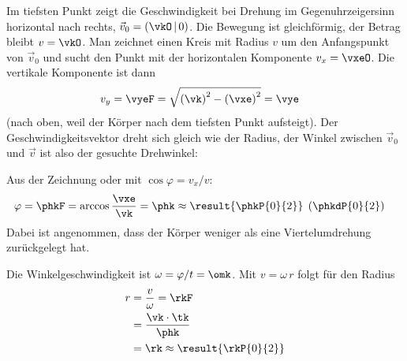 \begin{abcliste}
\abc Im tiefsten Punkt zeigt die Geschwindigkeit bei Drehung im Gegenuhrzeigersinn horizontal nach rechts, $\vec v_0 = \left(\vkO\,\middle|\,0\right)$. Die Bewegung ist gleichförmig, der Betrag bleibt $v = \vkO$. Man zeichnet einen Kreis mit Radius $v$ um den Anfangspunkt von $\vec v_0$ und sucht den Punkt mit der horizontalen Komponente $v_x = \vxeO$. Die vertikale Komponente ist dann
\begin{align}
 v_y &= \vyeF = \sqrt{\left(\vk\right)^2-\left(\vxe\right)^2} = \vye
\end{align}
(nach oben, weil der Körper nach dem tiefsten Punkt aufsteigt). Der Geschwindigkeitsvektor dreht sich gleich wie der Radius, der Winkel zwischen $\vec v_0$ und $\vec v$ ist also der gesuchte Drehwinkel:
\begin{center}
\hspace{1cm}
\end{center}
Aus der Zeichnung oder mit $\cos\varphi = v_x/v$:
\begin{align}
 \varphi &= \phkF = \arccos\frac{\vxe}{\vk} = \phk \approx \result{\phkP{0}{2}} \;\left(\phkdP{0}{2}\right)
\end{align}
Dabei ist angenommen, dass der Körper weniger als eine Viertelumdrehung zurückgelegt hat.

\abc Die Winkelgeschwindigkeit ist $\omega = \varphi/t = \omk$. Mit $v = \omega\,r$ folgt für den Radius
\begin{align}
 r &= \frac{v}{\omega} = \rkF \\
   &= \frac{\vk\cdot\tk}{\phk} \\
   &= \rk \approx \result{\rkP{0}{2}}
\end{align}
\end{abcliste}
